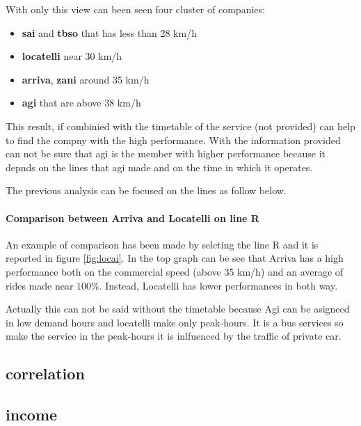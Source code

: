With only this view can been seen four cluster of companies:
\begin{itemize}
    \item \textbf{sai} and \textbf{tbso} that has less than 28 km/h
    \item \textbf{locatelli} near 30 km/h
    \item \textbf{arriva}, \textbf{zani} around 35 km/h
    \item \textbf{agi} that are above 38 km/h 
\end{itemize}
This result, if combinied with the timetable of the service (not provided) can help to find the compny with the high performance. With the information provided can not be sure that agi is the member with higher performance because it depnds on the lines that agi made and on the time in which it operates. 

The previous analysis can be focused on the lines as follow below.

\paragraph{Comparison between Arriva and Locatelli on line R} An example of comparison has been made by selcting the line R and it is reported in figure \ref{fig:locai}. In the top graph can be see that Arriva has a high performance both on the commercial speed (above 35 km/h) and an average of rides made near $100\%$. Instead, Locatelli has lower performances in both way. 

Actually this can not be said without the timetable because Agi can be asignecd in low demand hours and locatelli make only peak-hours. It is a bus services so make the service in the peak-hours it is inlfuenced by the traffic of private car.

\newpage
\begin{landscape}
\thispagestyle{empty}

\end{landscape}
\newpage

\newpage
\begin{landscape}
\thispagestyle{empty}

\end{landscape}
\newpage

\subsection{correlation}

\subsection{income}